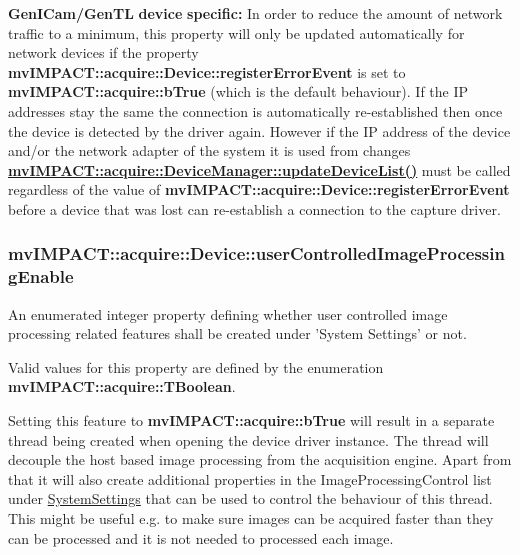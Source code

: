 {\bfseries Gen\+I\+Cam/\+Gen\+T\+L} {\bfseries device} {\bfseries specific\+:} In order to reduce the amount of network traffic to a minimum, this property will only be updated automatically for network devices if the property {\bfseries mv\+I\+M\+P\+A\+C\+T\+::acquire\+::\+Device\+::register\+Error\+Event} is set to {\bfseries mv\+I\+M\+P\+A\+C\+T\+::acquire\+::b\+True} (which is the default behaviour). If the I\+P addresses stay the same the connection is automatically re-\/established then once the device is detected by the driver again. However if the I\+P address of the device and/or the network adapter of the system it is used from changes {\bfseries \hyperlink{classmv_i_m_p_a_c_t_1_1acquire_1_1_device_manager_a2078f9532f67854352c3be3e32364879}{mv\+I\+M\+P\+A\+C\+T\+::acquire\+::\+Device\+Manager\+::update\+Device\+List()}} must be called regardless of the value of {\bfseries mv\+I\+M\+P\+A\+C\+T\+::acquire\+::\+Device\+::register\+Error\+Event} before a device that was lost can re-\/establish a connection to the capture driver. \hypertarget{classmv_i_m_p_a_c_t_1_1acquire_1_1_device_a4d5db996353c3b9ada5f6a15fb19f9eb}{
\subsubsection[{user\+Controlled\+Image\+Processing\+Enable}]{ mv\+I\+M\+P\+A\+C\+T\+::acquire\+::\+Device\+::user\+Controlled\+Image\+Processing\+Enable}}\label{classmv_i_m_p_a_c_t_1_1acquire_1_1_device_a4d5db996353c3b9ada5f6a15fb19f9eb}


An enumerated integer property defining whether user controlled image processing related features shall be created under 'System Settings' or not. 

Valid values for this property are defined by the enumeration {\bfseries mv\+I\+M\+P\+A\+C\+T\+::acquire\+::\+T\+Boolean}.

Setting this feature to {\bfseries mv\+I\+M\+P\+A\+C\+T\+::acquire\+::b\+True} will result in a separate thread being created when opening the device driver instance. The thread will decouple the host based image processing from the acquisition engine. Apart from that it will also create additional properties in the {\ttfamily Image\+Processing\+Control} list under {\ttfamily \hyperlink{classmv_i_m_p_a_c_t_1_1acquire_1_1_system_settings}{System\+Settings}} that can be used to control the behaviour of this thread. This might be useful e.\+g. to make sure images can be acquired faster than they can be processed and it is not needed to processed each image.

